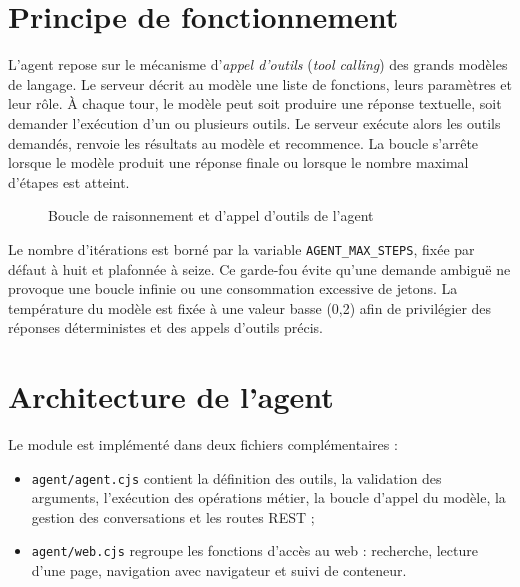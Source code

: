 \documentclass[12pt,a4paper,oneside]{report}
\newcommand{\code}[1]{\texttt{#1}}
\begin{document}
\section{Principe de fonctionnement}
L'agent repose sur le mécanisme d'\emph{appel d'outils} (\emph{tool calling}) des grands modèles de langage. Le serveur décrit au modèle une liste de fonctions, leurs paramètres et leur rôle. À chaque tour, le modèle peut soit produire une réponse textuelle, soit demander l'exécution d'un ou plusieurs outils. Le serveur exécute alors les outils demandés, renvoie les résultats au modèle et recommence. La boucle s'arrête lorsque le modèle produit une réponse finale ou lorsque le nombre maximal d'étapes est atteint.

\begin{figure}[H]\centering
{}
\caption{Boucle de raisonnement et d'appel d'outils de l'agent}
\end{figure}

Le nombre d'itérations est borné par la variable \code{AGENT\_MAX\_STEPS}, fixée par défaut à huit et plafonnée à seize. Ce garde-fou évite qu'une demande ambiguë ne provoque une boucle infinie ou une consommation excessive de jetons. La température du modèle est fixée à une valeur basse (0,2) afin de privilégier des réponses déterministes et des appels d'outils précis.

\section{Architecture de l'agent}
Le module est implémenté dans deux fichiers complémentaires :
\begin{itemize}
  \item \code{agent/agent.cjs} contient la définition des outils, la validation des arguments, l'exécution des opérations métier, la boucle d'appel du modèle, la gestion des conversations et les routes REST ;
  \item \code{agent/web.cjs} regroupe les fonctions d'accès au web : recherche, lecture d'une page, navigation avec navigateur et suivi de conteneur.
\end{itemize}
\end{document}
